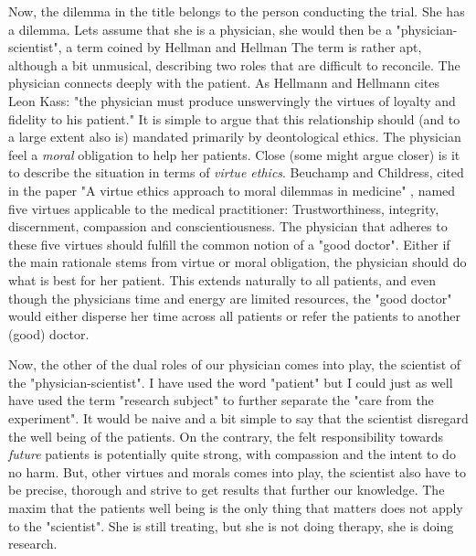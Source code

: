 \documentclass[12p]{article}
\begin{document}
Now, the dilemma in the title belongs to the person conducting the trial.
She has a dilemma.
Lets assume that she is a physician, she would then be a "physician-scientist", a term coined by Hellman and Hellman \cite{micenotmen}
The term is rather apt, although a bit unmusical, describing two roles that are difficult to reconcile.
The physician connects deeply with the patient.
As Hellmann and Hellmann cites Leon Kass: "the physician must produce unswervingly the virtues of loyalty and fidelity to his patient."
It is simple to argue that this relationship should (and to a large extent also is) mandated primarily by deontological ethics.
The physician feel a \emph{moral} obligation to help her patients.
Close (some might argue closer) is it to describe the situation in terms of \emph{virtue ethics}.
Beuchamp and Childress, cited in the paper "A virtue ethics approach to moral dilemmas in medicine" \cite{virtueethics}, named five virtues applicable to the medical practitioner: 
Trustworthiness, integrity, discernment, compassion and conscientiousness.
The physician that adheres to these five virtues should fulfill the common notion of a "good doctor".
Either if the main rationale stems from virtue or moral obligation, the physician should do what is best for her patient.
This extends naturally to all patients, and even though the physicians time and energy are limited resources, the "good doctor" would either disperse her time across all patients or refer the patients to another (good) doctor.

Now, the other of the dual roles of our physician comes into play, the scientist of the "physician-scientist".
I have used the word "patient" but I could just as well have used the term "research subject" to further separate the "care from the experiment".
It would be naive and a bit simple to say that the scientist disregard the well being of the patients.
On the contrary, the felt responsibility towards \emph{future} patients is potentially quite strong, with compassion and the intent to do no harm.
But, other virtues and morals comes into play, the scientist also have to be precise, thorough and strive to get results that further our knowledge.
The maxim that the patients well being is the only thing that matters does not apply to the "scientist".
She is still treating, but she is not doing therapy, she is doing research.
\end{document}
